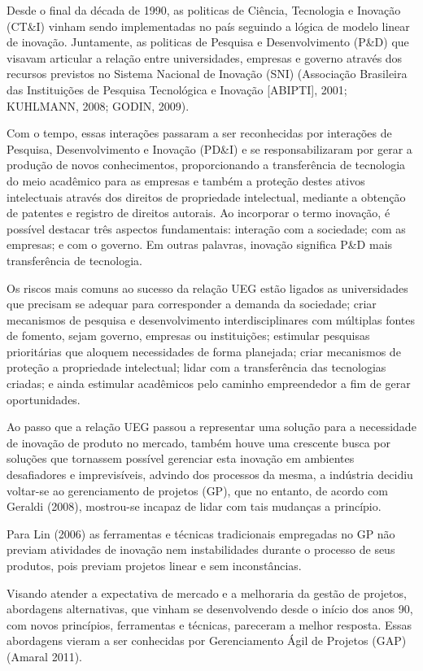 Desde o final da década de 1990, as politicas de Ciência, Tecnologia e Inovação (CT\&I) vinham sendo implementadas no país seguindo a lógica de modelo linear de inovação. Juntamente, as politicas de Pesquisa e Desenvolvimento (P\&D) que visavam articular a relação entre universidades, empresas e governo através dos recursos previstos no Sistema Nacional de Inovação (SNI) (Associação Brasileira das Instituições de Pesquisa Tecnológica e Inovação [ABIPTI], 2001; KUHLMANN, 2008; GODIN, 2009).

Com o tempo, essas interações passaram a ser reconhecidas por interações de Pesquisa, Desenvolvimento e Inovação (PD\&I) e se responsabilizaram por gerar a produção de novos conhecimentos, proporcionando a transferência de tecnologia do meio acadêmico para as empresas e também a proteção destes ativos intelectuais através dos direitos de propriedade intelectual, mediante a obtenção de patentes e registro de direitos autorais. Ao incorporar o termo inovação, é possível destacar três aspectos fundamentais: interação com a sociedade; com as empresas; e com o governo. Em outras palavras, inovação significa P\&D mais transferência de tecnologia.

Os riscos mais comuns ao sucesso da relação UEG estão ligados as universidades que precisam se adequar para corresponder a demanda da sociedade; criar mecanismos de pesquisa e desenvolvimento interdisciplinares com múltiplas fontes de fomento, sejam governo, empresas ou instituições; estimular pesquisas prioritárias que aloquem necessidades de forma planejada; criar mecanismos de proteção a propriedade intelectual; lidar com a transferência das tecnologias criadas; e ainda estimular acadêmicos pelo caminho empreendedor a fim de gerar oportunidades.

Ao passo que a relação UEG passou a representar uma solução para a necessidade de inovação de produto no mercado, também houve uma crescente busca por soluções que tornassem possível gerenciar esta inovação em ambientes desafiadores e imprevisíveis, advindo dos processos da mesma, a indústria decidiu voltar-se ao gerenciamento de projetos (GP), que no entanto, de acordo com Geraldi (2008), mostrou-se incapaz de lidar com tais mudanças a princípio.

Para Lin (2006) as ferramentas e técnicas tradicionais empregadas no GP não previam atividades de inovação nem instabilidades durante o processo de seus produtos, pois previam projetos linear e sem inconstâncias.

Visando atender a expectativa de mercado e a melhoraria da gestão de projetos, abordagens alternativas, que vinham se desenvolvendo desde o início dos anos 90, com novos princípios, ferramentas e técnicas, pareceram a melhor resposta. Essas abordagens vieram a ser conhecidas por Gerenciamento Ágil de Projetos (GAP) (Amaral 2011).

